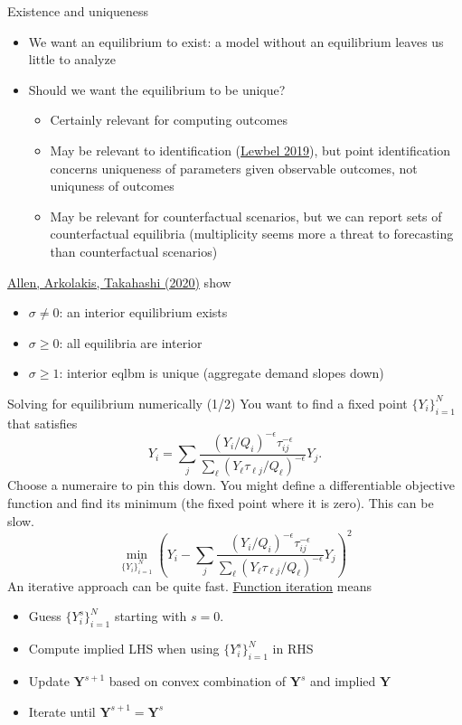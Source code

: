 \documentclass[10pt,notes=hide]{beamer}
\begin{document}
\begin{frame}{Existence and uniqueness}
\begin{itemize}
\item We want an equilibrium to exist:
a model without an equilibrium leaves us little to analyze
\item Should we want the equilibrium to be unique?
\begin{itemize}
\item Certainly relevant for computing outcomes
\item May be relevant to identification (\href{https://www.aeaweb.org/articles?id=10.1257/jel.20181361}{Lewbel 2019}),
but point identification concerns uniqueness of parameters given observable outcomes,
not uniquness of outcomes
\item May be relevant for counterfactual scenarios,
but we can report sets of counterfactual equilibria
(multiplicity seems more a threat to forecasting than counterfactual scenarios)
\end{itemize}
\end{itemize}
\href{https://doi.org/10.1086/704385}{Allen, Arkolakis, Takahashi (2020)} show
\begin{itemize}
\item $\sigma \neq 0$: an interior equilibrium exists
\item $\sigma \geq 0$: all equilibria are interior
\item $\sigma \geq 1$: interior eqlbm is unique (aggregate demand slopes down)
\end{itemize}
\end{frame}
\begin{frame}{Solving for equilibrium numerically (1/2)}
You want to find a fixed point $\{Y_i\}_{i=1}^{N}$ that satisfies
$$
Y_i
=
\sum_j \frac{\left(Y_i/Q_i\right)^{-\epsilon} \tau_{ij}^{-\epsilon}}{\sum_{\ell} \left(Y_{\ell} \tau_{\ell j} / Q_{\ell}\right)^{-\epsilon}} Y_j
.$$
Choose a numeraire to pin this down.
You might define a differentiable objective function and find its minimum (the fixed point where it is zero).
This can be slow.
$$
\min_{\{Y_{i}\}_{i=1}^{N}}
\left(Y_i
-
\sum_j \frac{\left(Y_i/Q_i\right)^{-\epsilon} \tau_{ij}^{-\epsilon}}{\sum_{\ell} \left(Y_{\ell} \tau_{\ell j} / Q_{\ell}\right)^{-\epsilon}} Y_j
\right)^2
$$
An iterative approach can be quite fast. \href{https://raw.githack.com/AEM7130/class-repo/master/lecture-notes/04-optimization/04-optimization.html\#40}{Function iteration} means
\begin{itemize}
\item Guess $\{Y_{i}^{s}\}_{i=1}^{N}$ starting with $s=0$.
\item Compute implied LHS when using $\{Y_{i}^{s}\}_{i=1}^{N}$ in RHS
\item Update $\mathbf{Y}^{s+1}$ based on convex combination of $\mathbf{Y}^{s}$ and implied $\mathbf{Y}$
\item Iterate until $\mathbf{Y}^{s+1} = \mathbf{Y}^{s}$
\end{itemize}
\end{frame}
\end{document}
